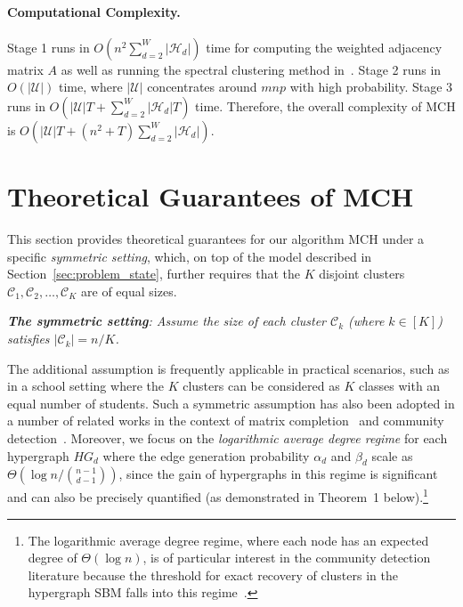 \documentclass{article}
\begin{document}
\paragraph{Computational Complexity.} Stage 1 runs in $O(n^2 \sum_{d=2}^W |\mathcal{H}_d|)$ time for computing the weighted adjacency matrix $A$ as well as running the spectral clustering method in~\citep{yun2016optimal}. Stage 2 runs in $O(|\mathcal{U}|)$ time, where $|\mathcal{U}|$ concentrates around $mnp$ with high probability. Stage 3 runs in $O(|\mathcal{U}|T + \sum_{d=2}^W |\mathcal{H}_d| T )$ time. Therefore, the overall complexity of MCH is $O( |\mathcal{U}|T + (n^2 + T)\sum_{d=2}^W |\mathcal{H}_d| )$.


\section{Theoretical Guarantees of MCH}\label{sce:MCH_Guarantee}
This section provides theoretical guarantees for our algorithm MCH under a specific \emph{symmetric setting}, which, on top of the model described in Section~\ref{sec:problem_state}, further requires that the $K$ disjoint clusters $\mathcal{C}_1, \mathcal{C}_2, \ldots, \mathcal{C}_K$ are of equal sizes.


\emph{\textbf{The symmetric setting}: Assume the size of each cluster $\mathcal{C}_k$ (where $k \in [K]$) satisfies $|\mathcal{C}_k| = n/K$.  }

The additional assumption is frequently applicable in practical scenarios, such as in a school setting where the $K$ clusters can be considered as $K$ classes with an equal number of students. Such a symmetric assumption has also been adopted in a number of related works in the context of matrix completion~\citep{ahn2018binary, jo2021discrete, zhang2022mc2g} and community detection~\citep{abbe2015exact, kim2018stochastic}. 
Moreover, we focus on the \emph{logarithmic average degree regime} for each hypergraph $HG_d$ where the edge generation probability $\alpha_d$ and $\beta_d$ scale as $\Theta(\log n / \binom{n-1}{d-1})$, since the gain of hypergraphs in this regime is significant and can also be precisely quantified (as demonstrated in Theorem~1 below).\footnote{The logarithmic average degree regime, where each node has an expected degree of $\Theta(\log n)$, is of particular interest in the community detection literature because the threshold for exact recovery of clusters in the hypergraph SBM falls into this regime~\citep{kim2018stochastic,zhang2022exact}.}
\end{document}
